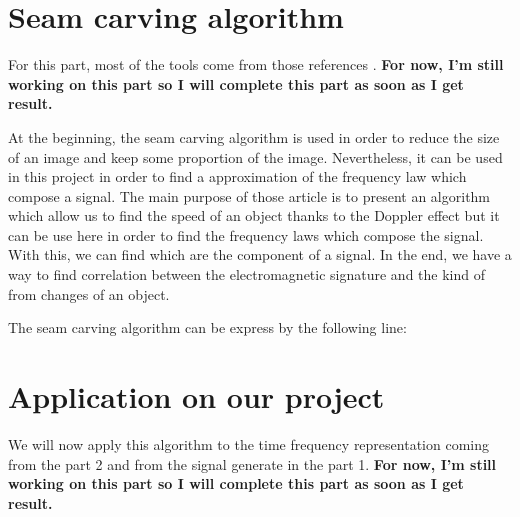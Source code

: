 


\chapter{Seam carving algorithm}

For this part, most of the tools come from those references \cite{Doopler1} \cite{Doopler2} \cite{Doopler3}.
\textbf{For now, I'm still working on this part so I will complete this part as soon as I get result.}

At the beginning, the seam carving algorithm is used in order to reduce the size of an image and keep some proportion of the image. Nevertheless, it can be used in this project in order to find a approximation of the frequency law which compose a signal.
The main purpose of those article is to present an algorithm which allow us to find the speed of an object thanks to the Doppler effect but it can be use here in order to find the frequency laws which compose the signal. With this, we can find which are the component of a signal. In the end, we have a way to find correlation between the electromagnetic signature and the kind of from changes of an object.

The seam carving algorithm can be express by the following line:


\chapter{Application on our project}

We will now apply this algorithm to the time frequency representation coming from the part 2 and from the signal generate in the part 1.
\textbf{For now, I'm still working on this part so I will complete this part as soon as I get result.}